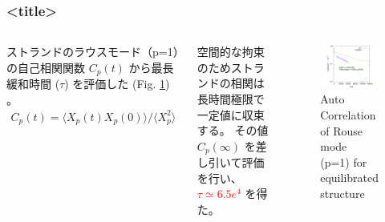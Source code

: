 \documentclass[12pt, dvipdfmx]{beamer}
\begin{document}
\begin{frame}
	\frametitle{<title>}
		\begin{columns}[totalwidth=\linewidth]
			ストランドのラウスモード（p=1）の自己相関関数 $C_p(t)$ から最長緩和時間 ($\tau$) を評価した (Fig. \ref{ac-xp}) 。
			\begin{align*}
				C_p(t) = \langle X_p(t)X_p(0) \rangle/\langle X_p^2 \rangle
			\end{align*}
			
			空間的な拘束のためストランドの相関は長時間極限で一定値に収束する。
			その値 $C_p(\infty)$ を差し引いて評価を行い、\textcolor{red}{$\tau \simeq 6.5e^{4}$} を得た。
			
			\begin{figure}[htb]
				\centering
					\includegraphics[width=.8\textwidth]{Xp_1_org.png}
					\caption{Auto Correlation of Rouse mode (p=1) for equilibrated structure}
					\label{ac-xp}
			\end{figure}
			\end{columns}
\end{frame}
\end{document}
